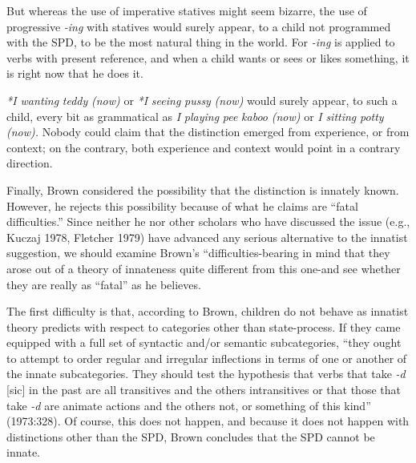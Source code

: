But whereas the use of imperative statives might seem bizarre, the use of progressive \textit{{}-ing} with statives would surely appear, to a child not programmed with the SPD, to be the most natural thing in the world. For \textit{{}-ing} is applied to verbs with present reference, and when a child wants or sees or likes something, it is right now that he does it.

\textit{*I wanting} \textit{teddy} \textit{(now}\textit{)} or \textit{*I} \textit{seeing} \textit{pussy} \textit{(now}\textit{)} would surely appear, to such a child, every bit as grammatical as \textit{I} \textit{playing} \textit{pee} \textit{k}\textit{aboo} \textit{(now}\textit{)} or \textit{I} \textit{sitting} \textit{potty} \textit{(}\textit{now)}\textit{.} Nobody could claim that the distinction emerged from experience, or from context; on the contrary, both experience and context would point in a contrary direction.

Finally, Brown considered the possibility that the distinction is innately known. However, he rejects this possibility because of what he claims are ``fatal difficulties.'' Since neither he nor other scholars who have discussed the issue (e.g., Kuczaj 1978, Fletcher 1979) have advanced any serious alternative to the innatist suggestion, we should examine Brown's ``difficulties{\textquotedbl}{}-bearing in mind that they arose out of a theory of innateness quite different from this one-and see whether they are really as ``fatal'' as he believes.

The first difficulty is that, according to Brown, children do not behave as innatist theory predicts with respect to categories other than state-process. If they came equipped with a full set of syntactic and/or semantic subcategories, ``they ought to attempt to order regular and irregular inflections in terms of one or another of the innate subcate\-gories. They should test the hypothesis that verbs that take \textit{{}-d }[sic] in the past are all transitives and the others intransitives or that those that take \textit{{}-d} are animate actions and the others not, or something of this kind'' (1973:328). Of course, this does not happen, and because it does not happen with distinctions other than the SPD, Brown con\-cludes that the SPD cannot be innate.

